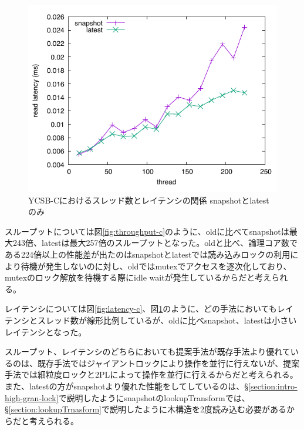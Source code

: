 \documentclass[a4paper]{jreport}	%
\begin{document}
\begin{figure}[h] 
\centering
\includegraphics[width=15cm]{ycsb-c/opposite-read-latency2}
\caption{YCSB-Cにおけるスレッド数とレイテンシの関係 snapshotとlatestのみ}
\label{fig:latency-c2}
\end{figure}

スループットについては図\ref{fig:throughput-c}のように、oldに比べてsnapshotは最大243倍、latestは最大257倍のスループットとなった。oldと比べ、論理コア数である224倍以上の性能差が出たのはsnapshotとlatestでは読み込みロックの利用により待機が発生しないのに対し、oldではmutexでアクセスを逐次化しており、mutexのロック解放を待機する際にidle waitが発生しているからだと考えられる。




レイテンシについては図\ref{fig:latency-c}、図\ref{fig:latency-c2}のように、どの手法においてもレイテンシとスレッド数が線形比例しているが、oldに比べsnapshot、latestは小さいレイテンシとなった。

スループット、レイテンシのどちらにおいても提案手法が既存手法より優れているのは、既存手法ではジャイアントロックにより操作を並行に行えないが、提案手法では細粒度ロックと2PLによって操作を並行に行えるからだと考えられる。また、latestの方がsnapshotより優れた性能をしてしているのは、§\ref{section:intro-high-gran-lock}で説明したようにsnapshotのlookupTransformでは、§\ref{section:lookupTrnasform}で説明したように木構造を2度読み込む必要があるからだと考えられる。
\end{document}
